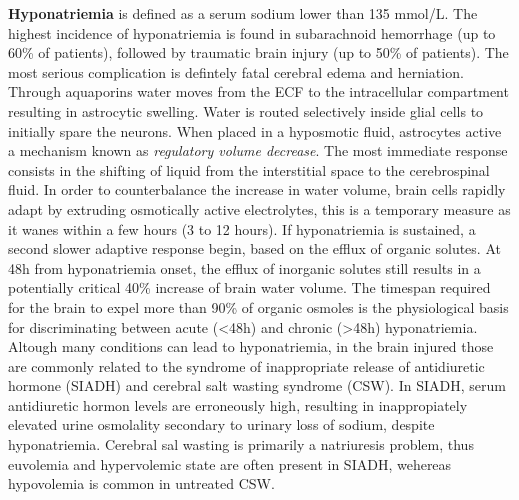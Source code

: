 \textbf{Hyponatriemia} is defined as a serum sodium lower than 135 mmol/L. The highest incidence of hyponatriemia is found in subarachnoid hemorrhage (up to 60\% of patients), followed by traumatic brain injury (up to 50\% of patients). The most serious complication is defintely fatal cerebral edema and herniation.
\newline Through aquaporins water moves from the ECF to the intracellular compartment resulting in astrocytic swelling. Water is routed selectively inside glial cells to initially spare the neurons. When placed in a hyposmotic fluid, astrocytes active a mechanism known as \textit {regulatory volume decrease}. The most immediate response consists in the shifting of liquid from the interstitial space to the cerebrospinal fluid. In order to counterbalance the increase in water volume, brain cells rapidly adapt by extruding osmotically active electrolytes, this is a temporary measure as it wanes within a few hours (3 to 12 hours\cite{seayDiagnosisManagementDisorders2020a}\cite{babaApproachManagementSodium2022a}). If hyponatriemia is sustained, a second slower adaptive response begin, based on the efflux of organic solutes. At 48h from hyponatriemia onset, the efflux of inorganic solutes still results in a potentially critical 40\% increase of brain water volume\cite{babaApproachManagementSodium2022a}. The timespan required for the brain to expel more than 90\% of organic osmoles is the physiological basis for discriminating between acute (<48h) and chronic (>48h) hyponatriemia\cite{rafatHyponatremiaIntensiveCare2015a}. 
\newline Altough many conditions can lead to hyponatriemia, in the brain injured those are commonly related to the syndrome of inappropriate release of antidiuretic hormone (SIADH) and cerebral salt wasting syndrome (CSW).
\newline In SIADH, serum antidiuretic hormon levels are erroneously high, resulting in inappropiately elevated urine osmolality secondary to urinary loss of sodium, despite hyponatriemia.
\newline Cerebral sal wasting is primarily a natriuresis problem, thus euvolemia and hypervolemic state are often present in SIADH, wehereas hypovolemia is common in untreated CSW.

